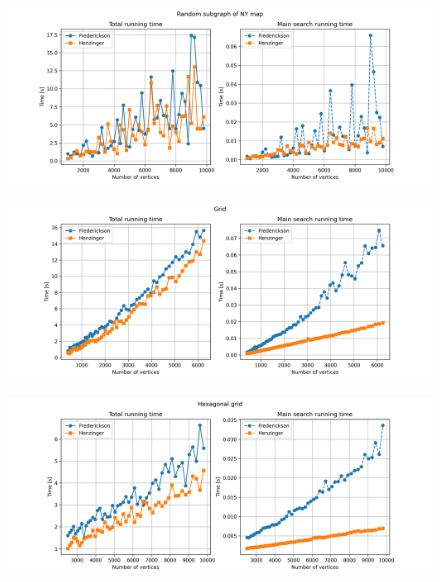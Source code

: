 \begin{figure}[H]
    \centering
    \begin{adjustbox}{center}
        \includegraphics[width=1.4\textwidth]{charts/city.png}
    \end{adjustbox}
    \caption{}
    \label{fig:city}
\end{figure}

\begin{figure}[H]
    \centering
    \begin{adjustbox}{center}
        \includegraphics[width=1.4\textwidth]{charts/grid.png}
    \end{adjustbox}
    \caption{}
    \label{fig:grid}
\end{figure}

\begin{figure}[H]
    \centering
    \begin{adjustbox}{center}
        \includegraphics[width=1.4\textwidth]{charts/hex.png}
    \end{adjustbox}
    \caption{}
    \label{fig:hex}
\end{figure}

